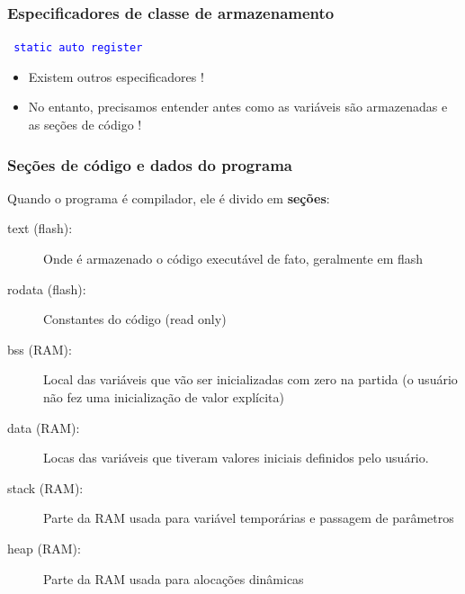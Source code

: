 \documentclass{beamer}
\begin{document}
\begin{frame}
	\frametitle{Especificadores de classe de armazenamento}
	\begin{center}
		\texttt{\textcolor{blue}{ static auto register}}
	\end{center}
		\vspace*{0.5cm}
	\begin{itemize}
	\item Existem outros especificadores !
	\item No entanto, precisamos entender antes como as variáveis são armazenadas e as seções de código !
	\end{itemize}
\end{frame}

\begin{frame}
	\frametitle{Seções de código e dados do programa}
    Quando o programa é compilador, ele é divido em \textbf{seções}:
    \begin{description}
    \item[text (flash):] Onde é armazenado o código executável de fato, geralmente em flash
    \item[rodata (flash):] Constantes do código (read only)
    \item[bss (RAM):] Local das variáveis que vão ser inicializadas com zero na partida (o usuário não fez uma inicialização de valor explícita)
    \item[data (RAM):] Locas das variáveis que tiveram valores iniciais definidos pelo usuário.
    \item[stack (RAM):] Parte da RAM usada para variável temporárias e passagem de parâmetros
    \item[heap (RAM):] Parte da RAM usada para alocações dinâmicas
    \end{description}
\end{frame}
\end{document}
